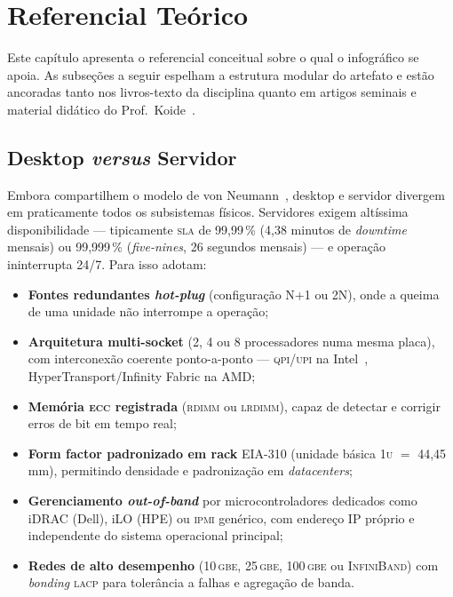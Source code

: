 \chapter{Referencial Teórico}
\label{cap:referencial}

Este capítulo apresenta o referencial conceitual sobre o qual o
infográfico se apoia. As subseções a seguir espelham a estrutura
modular do artefato e estão ancoradas tanto nos livros-texto da
disciplina quanto em artigos seminais e material didático do
Prof.\ Koide~\cite{koide2026}.

\section{Desktop \textit{versus} Servidor}
\label{sec:ref-desktop-servidor}

Embora compartilhem o modelo de von Neumann~\cite{stallings2017},
desktop e servidor divergem em praticamente todos os subsistemas
físicos. Servidores exigem altíssima disponibilidade --- tipicamente
\textsc{sla} de 99,99\,\% (4,38 minutos de \textit{downtime} mensais)
ou 99,999\,\% (\textit{five-nines}, 26 segundos mensais) --- e
operação ininterrupta 24/7. Para isso adotam:

\begin{itemize}
    \item \textbf{Fontes redundantes \textit{hot-plug}} (configuração
          N+1 ou 2N), onde a queima de uma unidade não interrompe a
          operação;
    \item \textbf{Arquitetura multi-socket} (2, 4 ou 8 processadores
          numa mesma placa), com interconexão coerente ponto-a-ponto
          --- \textsc{qpi}/\textsc{upi} na Intel~\cite{intel2009qpi},
          HyperTransport/Infinity Fabric na AMD;
    \item \textbf{Memória \textsc{ecc} registrada} (\textsc{rdimm} ou
          \textsc{lrdimm}), capaz de detectar e corrigir erros de bit
          em tempo real;
    \item \textbf{Form factor padronizado em rack} EIA-310 (unidade
          básica \textsc{1u} $=$ 44,45\,mm), permitindo densidade e
          padronização em \textit{datacenters};
    \item \textbf{Gerenciamento \textit{out-of-band}} por
          microcontroladores dedicados como iDRAC (Dell), iLO (HPE)
          ou \textsc{ipmi} genérico, com endereço IP próprio e
          independente do sistema operacional principal;
    \item \textbf{Redes de alto desempenho} (10\,\textsc{gbe},
          25\,\textsc{gbe}, 100\,\textsc{gbe} ou \textsc{InfiniBand})
          com \textit{bonding} \textsc{lacp} para tolerância a
          falhas e agregação de banda.
\end{itemize}

